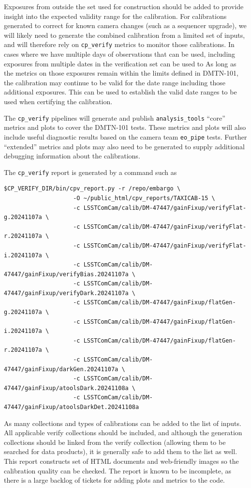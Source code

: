 \documentclass[DM,authoryear,toc]{lsstdoc}
\begin{document}
Exposures from outside the set used for construction should be added to provide insight into the expected validity range for the calibration.
For calibrations generated to correct for known camera changes (such as a sequencer upgrade), we will likely need to generate the combined calibration from a limited set of inputs, and will therefore rely on \verb|cp_verify| metrics to monitor those calibrations.
In cases where we have multiple days of observations that can be used, including exposures from multiple dates in the verification set can be used to 
As long as the metrics on those exposures remain within the limits defined in DMTN-101, the calibration may continue to be valid for the date range including those additional exposures.
This can be used to establish the valid date ranges to be used when certifying the calibration.

The \verb|cp_verify| pipelines will generate and publish \verb|analysis_tools| ``core'' metrics and plots to cover the DMTN-101 tests.
These metrics and plots will also include useful diagnostic results based on the camera team \verb|eo_pipe| tests.
Further ``extended'' metrics and plots may also need to be generated to supply additional debugging information about the calibrations.

The \verb|cp_verify| report is generated by a command such as
\begin{verbatim}
$CP_VERIFY_DIR/bin/cpv_report.py -r /repo/embargo \
                    -O ~/public_html/cpv_reports/TAXICAB-15 \
                    -c LSSTComCam/calib/DM-47447/gainFixup/verifyFlat-g.20241107a \
                    -c LSSTComCam/calib/DM-47447/gainFixup/verifyFlat-r.20241107a \
                    -c LSSTComCam/calib/DM-47447/gainFixup/verifyFlat-i.20241107a \
                    -c LSSTComCam/calib/DM-47447/gainFixup/verifyBias.20241107a \
                    -c LSSTComCam/calib/DM-47447/gainFixup/verifyDark.20241107a \
                    -c LSSTComCam/calib/DM-47447/gainFixup/flatGen-g.20241107a \
                    -c LSSTComCam/calib/DM-47447/gainFixup/flatGen-i.20241107a \
                    -c LSSTComCam/calib/DM-47447/gainFixup/flatGen-r.20241107a \
                    -c LSSTComCam/calib/DM-47447/gainFixup/darkGen.20241107a \
                    -c LSSTComCam/calib/DM-47447/gainFixup/atoolsDark.20241108a \
                    -c LSSTComCam/calib/DM-47447/gainFixup/atoolsDarkDet.20241108a
\end{verbatim}
As many collections and types of calibrations can be added to the list of inputs.
All applicable verify collections should be included, and although the generation collections should be linked from the verify collection (allowing them to be searched for data products), it is generally safe to add them to the list as well.
This report constructs set of HTML documents and web-friendly images so the calibration quality can be checked.
The report is known to be incomplete, as there is a large backlog of tickets for adding plots and metrics to the code.
\end{document}
